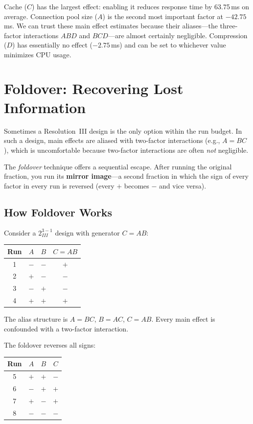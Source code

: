 \documentclass[11pt]{book}
\begin{document}
Cache ($C$) has the largest effect: enabling it reduces response time by
63.75\,ms on average. Connection pool size ($A$) is the second most important
factor at $-42.75$\,ms. We can trust these main effect estimates because their
aliases---the three-factor interactions $ABD$ and $BCD$---are almost certainly
negligible. Compression ($D$) has essentially no effect ($-2.75$\,ms) and can
be set to whichever value minimizes CPU usage.

\section{Foldover: Recovering Lost Information}

Sometimes a Resolution~III design is the only option within the run budget.
In such a design, main effects are aliased with two-factor interactions
(e.g., $A = BC$), which is uncomfortable because two-factor interactions are
often \emph{not} negligible.

The \emph{foldover} technique offers a sequential escape. After running the
original fraction, you run its \textbf{mirror image}---a second fraction in
which the sign of every factor in every run is reversed (every $+$ becomes $-$
and vice versa).

\subsection{How Foldover Works}

Consider a $2^{3-1}_{III}$ design with generator $C = AB$:
\begin{center}
\begin{tabular}{cccc}
\toprule
Run & $A$ & $B$ & $C = AB$ \\
\midrule
1 & $-$ & $-$ & $+$ \\
2 & $+$ & $-$ & $-$ \\
3 & $-$ & $+$ & $-$ \\
4 & $+$ & $+$ & $+$ \\
\bottomrule
\end{tabular}
\end{center}

The alias structure is $A = BC$, $B = AC$, $C = AB$. Every main effect is
confounded with a two-factor interaction.

The foldover reverses all signs:
\begin{center}
\begin{tabular}{cccc}
\toprule
Run & $A$ & $B$ & $C$ \\
\midrule
5 & $+$ & $+$ & $-$ \\
6 & $-$ & $+$ & $+$ \\
7 & $+$ & $-$ & $+$ \\
8 & $-$ & $-$ & $-$ \\
\bottomrule
\end{tabular}
\end{center}
\end{document}
